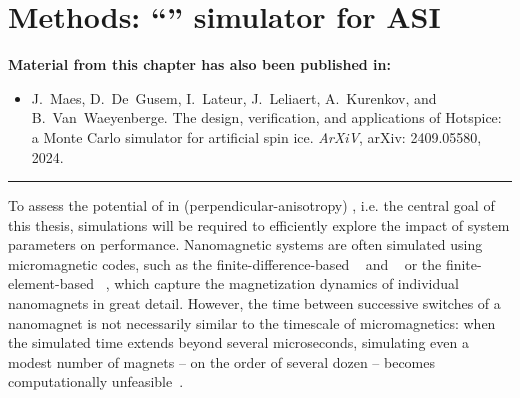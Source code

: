 \chapter{Methods: ``\hotspice'' simulator for ASI}\label{ch:Hotspice}

\begin{adjustwidth}{2em}{2em} %
    \begin{center}
        \textbf{Material from this chapter has also been published in:} \\
    \end{center}
    \vspace{1em}
    \begin{adjustwidth}{0em}{2em}
	    \begin{itemize}
	    	\item[\cite{MAES-24}] J.~Maes, D.~De~Gusem, I.~Lateur, J.~Leliaert, A.~Kurenkov, and B.~Van~Waeyenberge.
	    	\newblock The design, verification, and applications of Hotspice: a Monte Carlo simulator for artificial spin ice.
	    	\newblock \emph{ArXiV}, arXiv: 2409.05580, 2024.
	    \end{itemize}
    \end{adjustwidth}
    \vspace{1em}
    \begin{center}
        \centering\rule{0.6\linewidth}{0.4pt}
    \end{center}
    \vspace{1em}
\end{adjustwidth}

To assess the potential of  in (perpendicular-anisotropy) , i.e. the central goal of this thesis, simulations will be required to efficiently explore the impact of system parameters on performance. Nanomagnetic systems are often simulated using micromagnetic codes, such as the finite-difference-based \mumax~\cite{mumax3} and \oommf~\cite{OOMMF} or the finite-element-based \nmag~\cite{Nmag}, which capture the magnetization dynamics of individual nanomagnets in great detail. However, the time between successive switches of a nanomagnet is not necessarily similar to the timescale of micromagnetics: when the simulated time extends beyond several microseconds, simulating even a modest number of magnets -- on the order of several dozen -- becomes computationally unfeasible~\cite{leo2021chiral}. \par %

